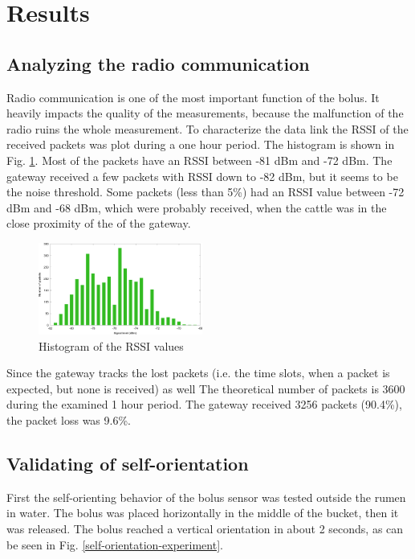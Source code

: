 \documentclass[conference]{IEEEtran}
\begin{document}
\section{Results}

\subsection{Analyzing the radio communication}

Radio communication is one of the most important function of the bolus. It
heavily impacts the quality of the measurements, because the malfunction of the
radio ruins the whole measurement. To characterize the data link the RSSI of
the received packets was plot during a one hour period. The histogram is shown
in Fig. \ref{rssi-hist}. Most of the packets have an RSSI between -81 dBm and
-72 dBm. The gateway received a few packets with RSSI down to -82 dBm, but it
seems to be the noise threshold. Some packets (less than 5\%) had an RSSI value
between -72 dBm and -68 dBm, which were probably received, when the cattle was
in the close proximity of the of the gateway.

\begin{figure}[htbp]
  \centerline{\includegraphics[width=0.48\textwidth]{fig/rssi_hist.png}}
  \caption{Histogram of the RSSI values}
  \label{rssi-hist}
\end{figure}

Since the gateway tracks the lost packets (i.e. the time slots, when a packet
is expected, but none is received) as well The theoretical number of packets is
3600 during the examined 1 hour period. The gateway received 3256 packets
(90.4\%), the packet loss was 9.6\%.

\subsection{Validating of self-orientation}

First the self-orienting behavior of the bolus sensor was tested outside the
rumen in water. The bolus was placed horizontally in the middle of the bucket,
then it was released. The bolus reached a vertical orientation in about 2 seconds,
as can be seen in Fig. \ref{self-orientation-experiment}.
\end{document}
